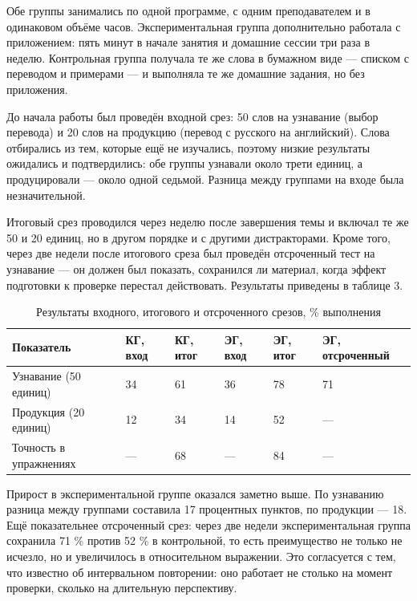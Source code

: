 \documentclass[11pt,a4paper,openany]{report}
\begin{document}
Обе группы занимались по одной программе, с одним преподавателем и в одинаковом объёме часов. Экспериментальная группа дополнительно работала с приложением: пять минут в начале занятия и домашние сессии три раза в неделю. Контрольная группа получала те же слова в бумажном виде — списком с переводом и примерами — и выполняла те же домашние задания, но без приложения.

До начала работы был проведён входной срез: 50 слов на узнавание (выбор перевода) и 20 слов на продукцию (перевод с русского на английский). Слова отбирались из тем, которые ещё не изучались, поэтому низкие результаты ожидались и подтвердились: обе группы узнавали около трети единиц, а продуцировали — около одной седьмой. Разница между группами на входе была незначительной.

Итоговый срез проводился через неделю после завершения темы и включал те же 50 и 20 единиц, но в другом порядке и с другими дистракторами. Кроме того, через две недели после итогового среза был проведён отсроченный тест на узнавание — он должен был показать, сохранился ли материал, когда эффект подготовки к проверке перестал действовать. Результаты приведены в таблице 3.

\begin{table}[htbp]
\centering
\small
\caption{Результаты входного, итогового и отсроченного срезов, \% выполнения}
\begin{tabular}{|p{4.4cm}|p{2.2cm}|p{2.2cm}|p{2.2cm}|p{2.2cm}|p{2.6cm}|}
\hline
Показатель & КГ, вход & КГ, итог & ЭГ, вход & ЭГ, итог & ЭГ, отсроченный \\
\hline
Узнавание (50 единиц) & 34 & 61 & 36 & 78 & 71 \\
\hline
Продукция (20 единиц) & 12 & 34 & 14 & 52 & — \\
\hline
Точность в упражнениях & — & 68 & — & 84 & — \\
\hline
\end{tabular}
\end{table}

Прирост в экспериментальной группе оказался заметно выше. По узнаванию разница между группами составила 17 процентных пунктов, по продукции — 18. Ещё показательнее отсроченный срез: через две недели экспериментальная группа сохранила 71 \% против 52 \% в контрольной, то есть преимущество не только не исчезло, но и увеличилось в относительном выражении. Это согласуется с тем, что известно об интервальном повторении: оно работает не столько на момент проверки, сколько на длительную перспективу.
\end{document}
